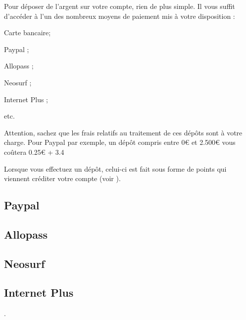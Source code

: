 ﻿Pour déposer de l'argent sur votre compte, rien de plus simple. Il vous suffit d'accéder à l'un des nombreux moyens de paiement mis à votre disposition :
\item Carte bancaire;
\item Paypal ;
\item Allopass ;
\item Neosurf ;
\item Internet Plus ;
\item etc.

Attention, sachez que les frais relatifs au traitement de ces dépôts sont à votre charge. Pour Paypal par exemple, un dépôt compris entre 0€ et 2.500€ vous coûtera 0.25€ + 3.4%

Lorsque vous effectuez un dépôt, celui-ci est fait sous forme de points qui viennent créditer votre compte \eDevoir (voir ).

\subsection{Paypal}
\subsection{Allopass}
\subsection{Neosurf}
\subsection{Internet Plus}.